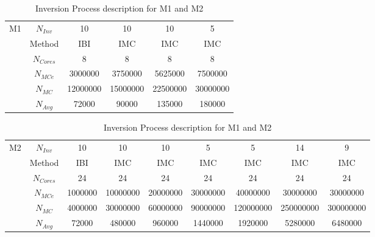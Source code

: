 \documentclass[10pt,a4paper,twoside]{article}
\begin{document}
  \begin{table}[ht!] 
  \centering
\begin{threeparttable}

  \caption{Inversion Process description for M1 and M2}

\begin{tabular}{|c|c|c|c|c|c|}
\hline
\multirow{6}{*}{M1} & $N_{Inv}$   & 10       & 10       & 10       & 5        \\ \cline{2-6} 
                    & Method      & IBI      & IMC      & IMC      & IMC      \\ \cline{2-6} 
                    & $N_{Cores}$ & 8        & 8        & 8        & 8        \\ \cline{2-6} 
                    & $N_{MCe}$   & 3000000  & 3750000  & 5625000  & 7500000  \\ \cline{2-6} 
                    & $N_{MC}$    & 12000000 & 15000000 & 22500000 & 30000000 \\ \cline{2-6} 
                    & $N_{Avg}$   & 72000    & 90000    & 135000   & 180000   \\ \hline
\end{tabular}

 
\end{threeparttable}
\begin{threeparttable}
\begin{tabular}{|c|c|c|c|c|c|c|c|c|}
\hline
\multirow{6}{*}{M2} & $N_{Inv}$   & 10      & 10       & 10       & 5        & 5         & 14        & 9         \\ \cline{2-9} 
                    & Method      & IBI     & IMC      & IMC      & IMC      & IMC       & IMC       & IMC       \\ \cline{2-9} 
                    & $N_{Cores}$ & 24      & 24       & 24       & 24       & 24        & 24        & 24        \\ \cline{2-9} 
                    & $N_{MCe}$   & 1000000 & 10000000 & 20000000 & 30000000 & 40000000  & 30000000  & 30000000  \\ \cline{2-9} 
                    & $N_{MC}$    & 4000000 & 30000000 & 60000000 & 90000000 & 120000000 & 250000000 & 300000000 \\ \cline{2-9} 
                    & $N_{Avg}$   & 72000   & 480000   & 960000   & 1440000  & 1920000   & 5280000   & 6480000   \\ \hline
                    
\end{tabular} 
 \label{tab:MCexp1}%
\end{threeparttable}
\end{table}
 
\end{document}
